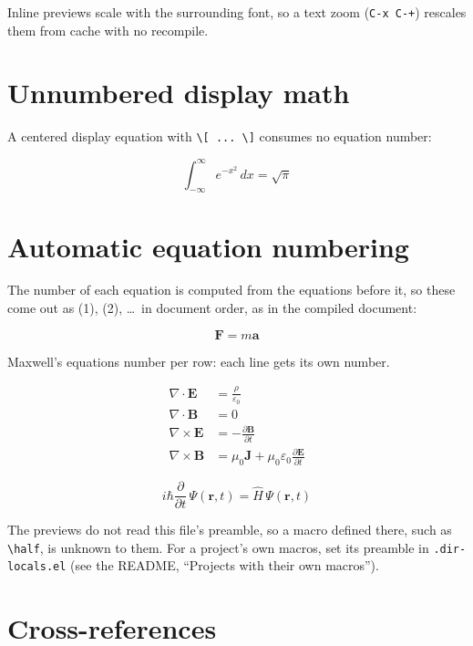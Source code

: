 \documentclass{article}
\newcommand{\half}{$\tfrac{1}{2}$}
\begin{document}
Inline previews scale with the surrounding font, so a text zoom
(\verb|C-x C-+|) rescales them from cache with no recompile.

\section{Unnumbered display math}

A centered display equation with \verb|\[ ... \]| consumes no equation
number:

\[ \int_{-\infty}^{\infty} e^{-x^2}\, dx = \sqrt{\pi} \]

\section{Automatic equation numbering}
\label{sec:numbering}

The number of each equation is computed from the equations before it, so these
come out as (1), (2), \dots\ in document order, as in the compiled document:

\begin{equation}
\label{eq:newton}
\mathbf{F} = m\mathbf{a}
\end{equation}

Maxwell's equations number per row: each line gets its own number.

\begin{align}
\label{eq:gauss-e}
\nabla \cdot \mathbf{E} &= \frac{\rho}{\varepsilon_0} \\
\nabla \cdot \mathbf{B} &= 0 \\
\nabla \times \mathbf{E} &= -\frac{\partial \mathbf{B}}{\partial t} \\
\nabla \times \mathbf{B} &= \mu_0 \mathbf{J} + \mu_0 \varepsilon_0 \frac{\partial \mathbf{E}}{\partial t}
\end{align}

\begin{equation}
\label{eq:schrodinger}
i\hbar \frac{\partial}{\partial t}\,\Psi(\mathbf{r}, t) = \hat{H}\,\Psi(\mathbf{r}, t)
\end{equation}

The previews do not read this file's preamble, so a macro defined there, such
as \verb|\half|, is unknown to them. For a project's own macros, set its
preamble in \verb|.dir-locals.el| (see the README, ``Projects with their own
macros'').

\section{Cross-references}
\label{sec:refs}
\end{document}
